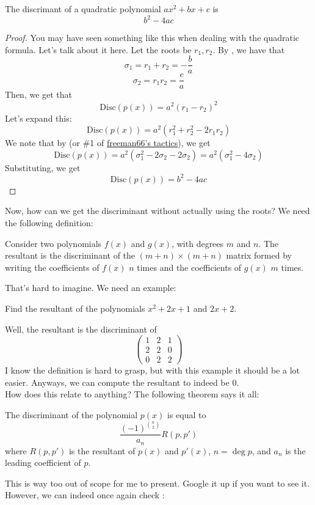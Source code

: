 \documentclass[11pt,titlepage]{scrartcl}
\begin{document}
\begin{corollary}\label{discquad}
The discrimant of a quadratic polynomial $ax^2+bx+c$ is
\[b^2-4ac\]
\end{corollary}
\begin{proof}
You may have seen something like this when dealing with the quadratic formula. Let's talk about it here. Let the roots be $r_1,r_2$. By , we have that
\[\sigma_1=r_1+r_2=-\dfrac ba\]
\[\sigma_2=r_1r_2=\dfrac ca\]
Then, we get that
\[\text{Disc}(p(x))=a^2(r_1-r_2)^2\]
Let's expand this:
\[\text{Disc}(p(x))=a^2(r_1^2+r_2^2-2r_1r_2)\]
We note that by  (or \#1 of \hyperlink{freelist}{freeman66's tactics}), we get
\[\text{Disc}(p(x))=a^2(\sigma_1^2-2\sigma_2-2\sigma_2)=a^2(\sigma_1^2-4\sigma_2)\]
Substituting, we get
\[\text{Disc}(p(x))=b^2-4ac\]
\end{proof}
Now, how can we get the discriminant without actually using the roots? We need the following definition:
\begin{defn}
Consider two polynomials $f(x)$ and $g(x)$, with degrees $m$ and $n$. The resultant is the discriminant of the $(m+n)\times (m+n)$ matrix formed by writing the coefficients of $f(x)$ $n$ times and the coefficients of $g(x)$ $m$ times.
\end{defn}
That's hard to imagine. We need an example:
\begin{example}
Find the resultant of the polynomials $x^2+2x+1$ and $2x+2$.
\end{example}
Well, the resultant is the discriminant of
\[\begin{pmatrix}1&2&1\\ 2&2&0\\ 0&2&2\end{pmatrix}\]
I know the definition is hard to grasp, but with this example it should be a lot easier. Anyways, we can compute the resultant to indeed be $0$.\\[2\baselineskip]
How does this relate to anything? The following theorem says it all:
\begin{theorem}\label{dr}
The discriminant of the polynomial $p(x)$ is equal to
\[\dfrac{(-1)^{\binom n2}}{a_n}R(p,p')\]
where $R(p,p')$ is the resultant of $p(x)$ and $p'(x)$, $n=\deg p$, and $a_n$ is the leading coefficient of $p$.
\end{theorem}
This is way too out of scope for me to present. Google it up if you want to see it. However, we can indeed once again check :
\end{document}
